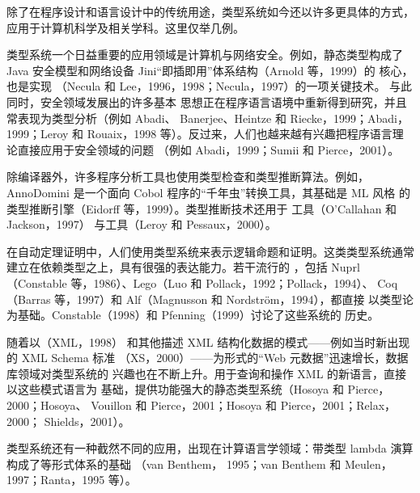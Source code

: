 除了在程序设计和语言设计中的传统用途，类型系统如今还以许多更具体的方式，
应用于计算机科学及相关学科。这里仅举几例。

类型系统一个日益重要的应用领域是计算机与网络安全。例如，静态类型构成了
Java 安全模型和网络设备 Jini“即插即用”体系结构（Arnold 等，1999）的
核心，也是实现
（Necula 和 Lee，1996，1998；Necula，1997）的一项关键技术。
与此同时，安全领域发展出的许多基本
思想正在程序语言语境中重新得到研究，并且常表现为类型分析（例如 Abadi、
Banerjee、Heintze 和 Riecke，1999；Abadi，1999；Leroy 和 Rouaix，1998
等）。反过来，人们也越来越有兴趣把程序语言理论直接应用于安全领域的问题
（例如 Abadi，1999；Sumii 和 Pierce，2001）。

除编译器外，许多程序分析工具也使用类型检查和类型推断算法。例如，
AnnoDomini 是一个面向 Cobol 程序的“千年虫”转换工具，其基础是 ML 风格
的类型推断引擎（Eidorff 等，1999）。类型推断技术还用于
工具（O'Callahan 和 Jackson，1997）
与工具（Leroy 和 Pessaux，2000）。

在自动定理证明中，人们使用类型系统来表示逻辑命题和证明。这类类型系统通常
建立在依赖类型之上，具有很强的表达能力。若干流行的
，包括 Nuprl
（Constable 等，1986）、Lego（Luo 和 Pollack，1992；Pollack，1994）、
Coq（Barras 等，1997）和 Alf（Magnusson 和 Nordström，1994），都直接
以类型论为基础。Constable（1998）和 Pfenning（1999）讨论了这些系统的
历史。

随着以（XML，1998）
和其他描述 XML 结构化数据的模式——例如当时新出现的 XML Schema 标准
（XS，2000）——为形式的“Web 元数据”迅速增长，数据库领域对类型系统的
兴趣也在不断上升。用于查询和操作 XML 的新语言，直接以这些模式语言为
基础，提供功能强大的静态类型系统（Hosoya 和 Pierce，2000；Hosoya、
Vouillon 和 Pierce，2001；Hosoya 和 Pierce，2001；Relax，2000；
Shields，2001）。

类型系统还有一种截然不同的应用，出现在计算语言学领域：带类型 lambda
演算构成了等形式体系的基础
（van Benthem，
1995；van Benthem 和 Meulen，1997；Ranta，1995 等）。

